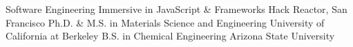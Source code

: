 \begin{cveducation}
  \cvedu
    {\normalsize Software Engineering Immersive in JavaScript \& Frameworks}
    {Hack Reactor, San Francisco}
  \cvedu
     {\normalsize Ph.D. \& M.S. in Materials Science and Engineering}
     {University of California at Berkeley}
  \cvedu
     {\normalsize B.S. in Chemical Engineering}
     {Arizona State University}
\end{cveducation}

